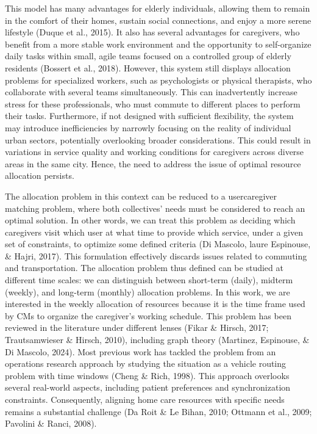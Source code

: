 \documentclass[10pt]{article}
\begin{document}
This model has many advantages for elderly individuals, allowing them to remain in the comfort of their homes, sustain social connections, and enjoy a more serene lifestyle (Duque et al., 2015). It also has several advantages for caregivers, who benefit from a more stable work environment and the opportunity to self-organize daily tasks within small, agile teams focused on a controlled group of elderly residents (Bossert et al., 2018). However, this system still displays allocation problems for specialized workers, such as psychologists or physical therapists, who collaborate with several teams simultaneously. This can inadvertently increase stress for these professionals, who must commute to different places to perform their tasks. Furthermore, if not designed with sufficient flexibility, the system may introduce inefficiencies by narrowly focusing on the reality of individual urban sectors, potentially overlooking broader considerations. This could result in variations in service quality and working conditions for caregivers across diverse areas in the same city. Hence, the need to address the issue of optimal resource allocation persists.

The allocation problem in this context can be reduced to a usercaregiver matching problem, where both collectives' needs must be considered to reach an optimal solution. In other words, we can treat this problem as deciding which caregivers visit which user at what time to provide which service, under a given set of constraints, to optimize some defined criteria (Di Mascolo, laure Espinouse, \& Hajri, 2017). This formulation effectively discards issues related to commuting and transportation. The allocation problem thus defined can be studied at different time scales: we can distinguish between short-term (daily), midterm (weekly), and long-term (monthly) allocation problems. In this work, we are interested in the weekly allocation of resources because it is the time frame used by CMs to organize the caregiver's working schedule. This problem has been reviewed in the literature under different lenses (Fikar \& Hirsch, 2017; Trautsamwieser \& Hirsch, 2010), including graph theory (Martinez, Espinouse, \& Di Mascolo, 2024). Most previous work has tackled the problem from an operations research approach by studying the situation as a vehicle routing problem with time windows (Cheng \& Rich, 1998). This approach overlooks several real-world aspects, including patient preferences and synchronization constraints. Consequently, aligning home care resources with specific needs remains a substantial challenge (Da Roit \& Le Bihan, 2010; Ottmann et al., 2009; Pavolini \& Ranci, 2008).
\end{document}
